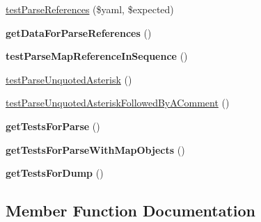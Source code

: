 \begin{DoxyCompactItemize}
\item 
\hyperlink{classSymfony_1_1Component_1_1Yaml_1_1Tests_1_1InlineTest_a1a8692b804b635c704d6de35c065aef3}{test\+Parse\+References} (\$yaml, \$expected)
\item 
{\bfseries get\+Data\+For\+Parse\+References} ()\hypertarget{classSymfony_1_1Component_1_1Yaml_1_1Tests_1_1InlineTest_a4f0559e9d7a137416be16c368f83a587}{}\label{classSymfony_1_1Component_1_1Yaml_1_1Tests_1_1InlineTest_a4f0559e9d7a137416be16c368f83a587}

\item 
{\bfseries test\+Parse\+Map\+Reference\+In\+Sequence} ()\hypertarget{classSymfony_1_1Component_1_1Yaml_1_1Tests_1_1InlineTest_a8d1e338aad26a420b8c7a97a3291a04f}{}\label{classSymfony_1_1Component_1_1Yaml_1_1Tests_1_1InlineTest_a8d1e338aad26a420b8c7a97a3291a04f}

\item 
\hyperlink{classSymfony_1_1Component_1_1Yaml_1_1Tests_1_1InlineTest_a966849e7665b3a5c902dfab02a8621f4}{test\+Parse\+Unquoted\+Asterisk} ()
\item 
\hyperlink{classSymfony_1_1Component_1_1Yaml_1_1Tests_1_1InlineTest_a51590824df02995e6d6c3b3587503f65}{test\+Parse\+Unquoted\+Asterisk\+Followed\+By\+A\+Comment} ()
\item 
{\bfseries get\+Tests\+For\+Parse} ()\hypertarget{classSymfony_1_1Component_1_1Yaml_1_1Tests_1_1InlineTest_affe52c07ba3ca7a3733d31886630c5f1}{}\label{classSymfony_1_1Component_1_1Yaml_1_1Tests_1_1InlineTest_affe52c07ba3ca7a3733d31886630c5f1}

\item 
{\bfseries get\+Tests\+For\+Parse\+With\+Map\+Objects} ()\hypertarget{classSymfony_1_1Component_1_1Yaml_1_1Tests_1_1InlineTest_aa40cb430229a212461e565fe3de6833c}{}\label{classSymfony_1_1Component_1_1Yaml_1_1Tests_1_1InlineTest_aa40cb430229a212461e565fe3de6833c}

\item 
{\bfseries get\+Tests\+For\+Dump} ()\hypertarget{classSymfony_1_1Component_1_1Yaml_1_1Tests_1_1InlineTest_adbd73451e0b7eef8dc22f6412f44668b}{}\label{classSymfony_1_1Component_1_1Yaml_1_1Tests_1_1InlineTest_adbd73451e0b7eef8dc22f6412f44668b}

\end{DoxyCompactItemize}


\subsection{Member Function Documentation}

